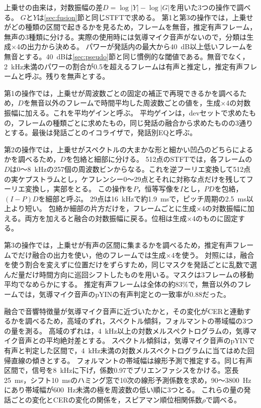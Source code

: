 \documentclass[xelatex,ja=standard,a4paper,twocolumn,10pt]{bxjsarticle}
\begin{document}
上乗せの由来は，対数振幅の差$D=\log|Y|-\log|G|$を用いた3つの操作で調べる。
$G$と$Y$は\ref{sec:fusion}節と同じSTFTで求める。
第1と第3の操作では，上乗せがどの種類の区間で起きるかを見るため，フレームを無音，推定有声フレーム，無声の3種類に分ける。実際の使用時には気導マイク音声がないので，分類は生成×4の出力から決める。
パワーが発話内の最大から40~dB以上低いフレームを無音とする。40~dBは\ref{sec:pseudo}節と同じ慣例的な閾値である。無音でなく，2~kHz未満のパワーの割合が0.5を超えるフレームは有声と推定し，推定有声フレームと呼ぶ。残りを無声とする。

第1の操作では，上乗せが周波数ごとの固定の補正で再現できるかを調べるため，$D$を無音以外のフレームで時間平均した周波数ごとの値を，生成×4の対数振幅に加える。これを平均ゲインと呼ぶ。
平均ゲインは，devセットで求めたもの，フレームの種類ごとに求めたもの，同じ発話の融合から求めたものの3通りとする。最後は発話ごとのイコライザで，発話別EQと呼ぶ。

第2の操作では，上乗せがスペクトルの大まかな形と細かい凹凸のどちらによるかを調べるため，$D$を包絡と細部に分ける。
512点のSTFTでは，各フレームの$D$は0〜8~kHzの257個の周波数ビンからなる。これを逆フーリエ変換して512点の実ケプストラムとし，ケフレンシー0〜29点とそれに対称な点だけを残してフーリエ変換し，実部をとる。
この操作を$P$，恒等写像を$I$とし，$PD$を包絡，$(I-P)D$を細部と呼ぶ。
29点は16~kHzで約1.9~msで，ピッチ周期の2.5~ms以上より短い。
包絡か細部の片方だけを，フレームごとに生成×4の対数振幅に加える。両方を加えると融合の対数振幅に戻る。位相は生成×4のものに固定する。

第3の操作では，上乗せが有声の区間に集まるかを調べるため，推定有声フレームでだけ融合の出力を使い，他のフレームでは生成×4を使う。
対照には，融合を使う割合を変えずに位置だけをずらすため，同じマスクを発話ごとに乱数で選んだ量だけ時間方向に巡回シフトしたものを用いる。マスクは3フレームの移動平均でなめらかにする。
推定有声フレームは全体の約83\%で，無音以外のフレームでは，気導マイク音声のpYIN\cite{pyin}の有声判定との一致率が0.88だった。

融合で音響特徴量が気導マイク音声に近づいたかと，その変化がCERと連動するかを調べるため，高域のずれ，スペクトル傾斜，フォルマントの帯域幅の3つの量を測る。
高域のずれは，4~kHz以上の対数メルスペクトログラムの，気導マイク音声との平均絶対差とする。
スペクトル傾斜は，気導マイク音声のpYINで有声と判定した区間で，4~kHz未満の対数メルスペクトログラムに当てはめた回帰直線の傾きとする。
フォルマントの帯域幅は線形予測で推定する。同じ有声区間で，信号を8~kHzに下げ，係数0.97でプリエンファシスをかける。窓長25~ms，シフト10~msのハミング窓で10次の線形予測係数を求め，90〜3800~Hzにあり帯域幅が600~Hz未満の極を周波数の低い順に3つとる。
これらの量の発話ごとの変化とCERの変化の関係を，スピアマン順位相関係数$\rho$で調べる。
\end{document}
